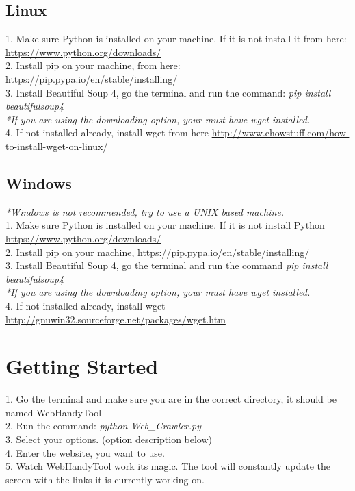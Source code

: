 \documentclass[12pt, titlepage]{article}
\begin{document}
\subsection{Linux}
1. Make sure Python is installed on your machine. If it is not install it from here: \url{https://www.python.org/downloads/}\\
2. Install pip on your machine, from here: \url{https://pip.pypa.io/en/stable/installing/}\\
3. Install Beautiful Soup 4, go the terminal and run the command: \textit{pip install beautifulsoup4}\\
\textit{*If you are using the downloading option, your must have wget installed.}\\
4. If not installed already, install wget from here \url{http://www.ehowstuff.com/how-to-install-wget-on-linux/}\\

\subsection{Windows}
\textit{*Windows is not recommended, try to use a UNIX based machine.}\\
1. Make sure Python is installed on your machine. If it is not install Python \url{https://www.python.org/downloads/}\\
2. Install pip on your machine,  \url{https://pip.pypa.io/en/stable/installing/}\\
3. Install Beautiful Soup 4, go the terminal and run the command \textit{pip install beautifulsoup4}\\
\textit{*If you are using the downloading option, your must have wget installed.}\\
4. If not installed already, install wget  \url{http://gnuwin32.sourceforge.net/packages/wget.htm}\\

\pagebreak
\section{Getting Started}
1. Go the terminal and make sure you are in the correct directory, it should be named WebHandyTool\\
2. Run the command: \textit{python Web\_Crawler.py}\\
3. Select your options. (option description below)\\
4. Enter the website, you want to use.\\
5. Watch WebHandyTool work its magic. The tool will constantly update the screen with the links it is currently working on.\\
\end{document}
